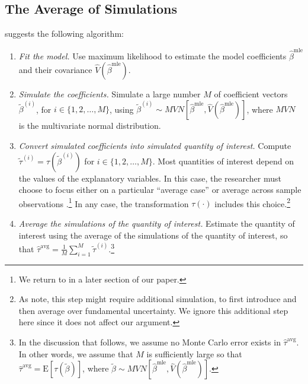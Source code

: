 \documentclass[11pt]{article}
\begin{document}
\subsection*{The Average of Simulations}

\cite{KingTomzWittenberg2000} suggests the following algorithm:\vspace{.1in}

\begin{enumerate}
\item \textit{Fit the model.}
Use maximum likelihood to estimate the model coefficients $\hat{\beta}^{\text{mle}}$ and their covariance $\hat{V} \left( \hat{\beta}^{\text{mle}} \right)$.
\item \textit{Simulate the coefficients.}
Simulate a large number $M$ of coefficient vectors $\tilde{\beta}^{(i)}$, for $i \in \{1, 2,\ldots, M\}$, using $\tilde{\beta}^{(i)} \sim MVN \left[ \hat{\beta}^{\text{mle}}, \hat{V} \left( \hat{\beta}^{\text{mle}} \right) \right]$, where $MVN$ is the multivariate normal distribution.
\item \textit{Convert simulated coefficients into simulated quantity of interest.}
Compute $\tilde{\tau}^{(i)} = \tau \left( \tilde{\beta}^{(i)} \right)$ for $i \in \{1, 2,\ldots, M\}$.
Most quantities of interest depend on the values of the explanatory variables.
In this case, the researcher must choose to focus either on a particular ``average case'' or average across sample observations \citep{HanmerKalkan2013}.\footnote{We return to \cite{HanmerKalkan2013} in a later section of our paper.}
In any case, the transformation $\tau(\cdot)$ includes this choice.\footnote{As \cite{KingTomzWittenberg2000} note, this step might require additional simulation, to first introduce and then average over fundamental uncertainty. We ignore this additional step here since it does not affect our argument.}
\item \textit{Average the simulations of the quantity of interest.}
Estimate the quantity of interest using the average of the simulations of the quantity of interest, so that $\hat{\tau}^{\text{avg}} = \frac{1}{M} \sum_{i = 1}^{M} \tilde{\tau}^{(i)}$.\footnote{In the discussion that follows, we assume no Monte Carlo error exists in $\hat{\tau}^{\text{avg}}$. In other words, we assume that $M$ is sufficiently large so that $\hat{\tau}^{\text{avg}} = \text{E}\left[ \tau \left(\tilde{\beta} \right) \right]$, where $\tilde{\beta} \sim MVN \left[ \hat{\beta}^{\text{mle}}, \hat{V} \left( \hat{\beta}^{\text{mle}} \right) \right]$.}\\
\end{enumerate}
\end{document}
